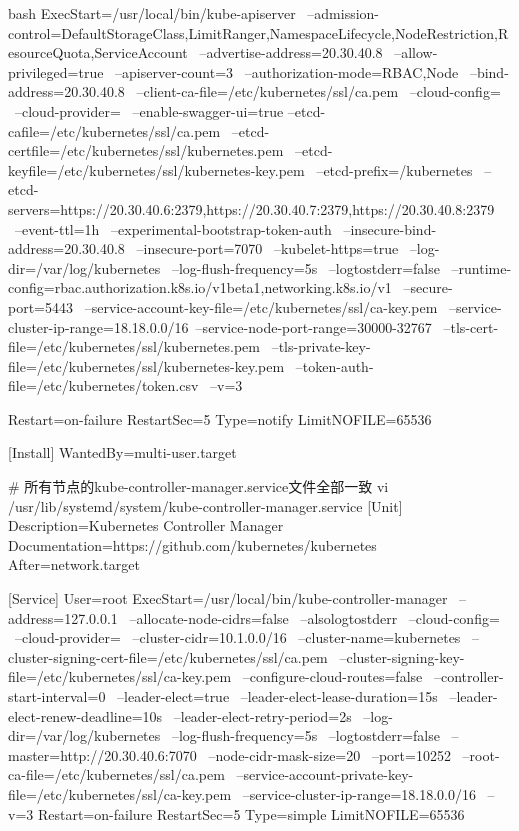 \begin{outline}[enumerate]
\begin{code-in-enumerate}{bash}
ExecStart=/usr/local/bin/kube-apiserver \
    --admission-control=DefaultStorageClass,LimitRanger,NamespaceLifecycle,NodeRestriction,ResourceQuota,ServiceAccount \
    --advertise-address=20.30.40.8 \
    --allow-privileged=true \
    --apiserver-count=3 \
    --authorization-mode=RBAC,Node \
    --bind-address=20.30.40.8 \
    --client-ca-file=/etc/kubernetes/ssl/ca.pem \
    --cloud-config= \
    --cloud-provider= \
    --enable-swagger-ui=true --etcd-cafile=/etc/kubernetes/ssl/ca.pem \
    --etcd-certfile=/etc/kubernetes/ssl/kubernetes.pem \
    --etcd-keyfile=/etc/kubernetes/ssl/kubernetes-key.pem \
    --etcd-prefix=/kubernetes \
    --etcd-servers=https://20.30.40.6:2379,https://20.30.40.7:2379,https://20.30.40.8:2379 \
    --event-ttl=1h \
    --experimental-bootstrap-token-auth \
    --insecure-bind-address=20.30.40.8 \
    --insecure-port=7070 \
    --kubelet-https=true \
    --log-dir=/var/log/kubernetes \
    --log-flush-frequency=5s \
    --logtostderr=false \
    --runtime-config=rbac.authorization.k8s.io/v1beta1,networking.k8s.io/v1 \
    --secure-port=5443 \
    --service-account-key-file=/etc/kubernetes/ssl/ca-key.pem \
    --service-cluster-ip-range=18.18.0.0/16\
    --service-node-port-range=30000-32767 \
    --tls-cert-file=/etc/kubernetes/ssl/kubernetes.pem \
    --tls-private-key-file=/etc/kubernetes/ssl/kubernetes-key.pem \
    --token-auth-file=/etc/kubernetes/token.csv \
    --v=3

Restart=on-failure
RestartSec=5
Type=notify
LimitNOFILE=65536

[Install]
WantedBy=multi-user.target

# 所有节点的kube-controller-manager.service文件全部一致
vi /usr/lib/systemd/system/kube-controller-manager.service
[Unit]
Description=Kubernetes Controller Manager
Documentation=https://github.com/kubernetes/kubernetes
After=network.target

[Service]
User=root
ExecStart=/usr/local/bin/kube-controller-manager \
    --address=127.0.0.1 \
    --allocate-node-cidrs=false \
    --alsologtostderr \
    --cloud-config= \
    --cloud-provider= \
    --cluster-cidr=10.1.0.0/16 \
    --cluster-name=kubernetes \
    --cluster-signing-cert-file=/etc/kubernetes/ssl/ca.pem \
    --cluster-signing-key-file=/etc/kubernetes/ssl/ca-key.pem \
    --configure-cloud-routes=false \
    --controller-start-interval=0 \
    --leader-elect=true \
    --leader-elect-lease-duration=15s \
    --leader-elect-renew-deadline=10s \
    --leader-elect-retry-period=2s \
    --log-dir=/var/log/kubernetes \
    --log-flush-frequency=5s \
    --logtostderr=false \
    --master=http://20.30.40.6:7070 \
    --node-cidr-mask-size=20 \
    --port=10252 \
    --root-ca-file=/etc/kubernetes/ssl/ca.pem \
    --service-account-private-key-file=/etc/kubernetes/ssl/ca-key.pem \
    --service-cluster-ip-range=18.18.0.0/16 \
    --v=3
Restart=on-failure
RestartSec=5
Type=simple
LimitNOFILE=65536


\end{code-in-enumerate}
\end{outline}
